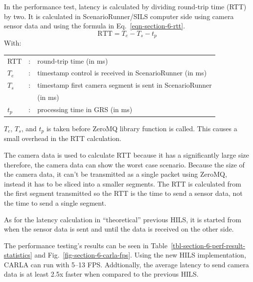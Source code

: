 In the performance test, latency is calculated by dividing round-trip time (RTT) by two.
It is calculated in ScenarioRunner/SILS computer side using camera sensor data
and using the formula in Eq.~\ref{eqn-section-6-rtt}.
\begin{equation}
	\label{eqn-section-6-rtt}
	\text{RTT} = T_{e} - T_{s} - t_p
\end{equation}
With:
\begin{table}[!h]
	\begin{tabular}{l l l}
		RTT     & : & round-trip time (in ms)                                  \\
		$T_{e}$ & : & timestamp control is received in ScenarioRunner (in ms)  \\
		$T_{s}$ & : & timestamp first camera segment is sent in ScenarioRunner \\
		        &   & (in ms)                                                  \\
		$t_p$   & : & processing time in GRS (in ms)
	\end{tabular}
\end{table}

$T_e$, $T_s$, and $t_p$ is taken before ZeroMQ library function is called. This
causes a small overhead in the RTT calculation.

The camera data is used to calculate RTT because it has a significantly large
size therefore, the camera data can show the worst case scenario.  Because the
size of the camera data, it can't be transmitted as a single packet using
ZeroMQ, instead it has to be sliced into a smaller segments. The RTT is
calculated from the first segment transmitted so the RTT is the time to send a
sensor data, not the time to send a single segment.

As for the latency calculation in ``theoretical'' previous HILS, it is started
from when the sensor data is sent and until the data is received on the other
side.

The performance testing's results can be seen in
Table~\ref{tbl-section-6-perf-result-statistics} and
Fig.~\ref{fig-section-6-carla-fps}. Using the new HILS implementation, CARLA can
run with 5--13 FPS. Addtionally, the average latency to send camera data is at
least 2.5x faster when compared to the previous HILS.

